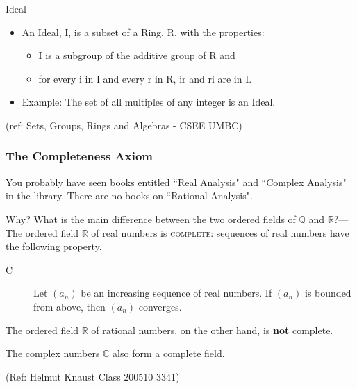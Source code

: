 \begin{frame}{Ideal}

\begin{itemize}
\item  An Ideal, I, is a subset of a Ring, R, with the properties:
\begin{itemize}
\item I is a subgroup of the additive group of R and
\item for every i in I and every r in R, ir and ri are in I.
\end{itemize}
\item   Example: The set of all multiples of any integer is an Ideal.

\end{itemize}


\tiny{(ref: Sets, Groups, Rings and Algebras - CSEE UMBC)}

\end{frame}


 \begin{frame}[fragile]\frametitle{The Completeness Axiom}

You probably have seen books entitled ``Real Analysis" and
``Complex Analysis" in the library. There are no books on
``Rational Analysis".

Why? What is the main difference between the two ordered fields of
${\mathbb Q}$ and ${\mathbb R}$?---The ordered field ${\mathbb R}$ of real numbers
is \textsc{complete}: sequences of real numbers have the following
property.

\begin{description}
\item[C] Let $(a_n)$ be an  increasing sequence of real numbers.
If $(a_n)$ is bounded from above, then $(a_n)$ converges.
\end{description}

The ordered field ${\mathbb R}$ of rational numbers, on the other hand,
is \textbf{not} complete.

The complex numbers ${\mathbb C}$ also form a complete field.

\tiny{(Ref: Helmut Knaust Class 200510 3341)}

\end{frame}